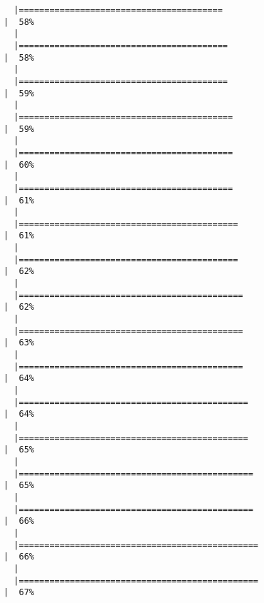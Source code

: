 \documentclass[12pt]{article}
\begin{document}
\begin{verbatim}
  |========================================                              |  58%
  |                                                                            
  |=========================================                             |  58%
  |                                                                            
  |=========================================                             |  59%
  |                                                                            
  |==========================================                            |  59%
  |                                                                            
  |==========================================                            |  60%
  |                                                                            
  |==========================================                            |  61%
  |                                                                            
  |===========================================                           |  61%
  |                                                                            
  |===========================================                           |  62%
  |                                                                            
  |============================================                          |  62%
  |                                                                            
  |============================================                          |  63%
  |                                                                            
  |============================================                          |  64%
  |                                                                            
  |=============================================                         |  64%
  |                                                                            
  |=============================================                         |  65%
  |                                                                            
  |==============================================                        |  65%
  |                                                                            
  |==============================================                        |  66%
  |                                                                            
  |===============================================                       |  66%
  |                                                                            
  |===============================================                       |  67%

\end{verbatim}
\end{document}
